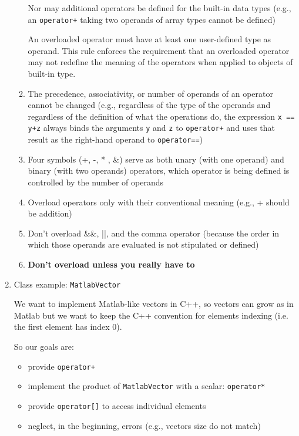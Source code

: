 \begin{enumerate}[$\triangleright$]
\begin{enumerate}[(1)]
    Nor may additional operators be defined for the built-in data types (e.g., an \texttt{operator+} taking two operands of array types cannot be defined)

    \begin{marker}
    An overloaded operator must have at least one user-defined type as operand. This rule enforces the requirement that an overloaded operator may not redefine the meaning of the operators when applied to objects of built-in type.
    \end{marker}

    \item The precedence, associativity, or number of operands of an operator cannot be changed (e.g., regardless of the type of the operands and regardless of the definition of what the operations do, the expression \texttt{x == y+z} always binds the arguments \texttt{y} and \texttt{z} to \texttt{operator+} and uses that result as the right-hand operand to \texttt{operator==})

    \item Four symbols (+, -, * , \&) serve as both unary (with one operand) and binary (with two operands) operators, which operator is being defined is controlled by the number of operands

    \item Overload operators only with their conventional meaning (e.g., + should be addition)

    \item Don't overload \&\&, ||, and the comma operator (because the order in which those operands are evaluated is not stipulated or defined)

    \item \textbf{Don’t overload unless you really have to}
\end{enumerate}

\item Class example: \texttt{MatlabVector}

We want to implement Matlab-like vectors in C++, so vectors can grow as in Matlab 
but we want to keep the C++ convention for elements indexing (i.e. the first element has index 0). 

So our goals are:
\begin{itemize}
    \item provide \texttt{operator+}
    \item implement the product of \texttt{MatlabVector} with a scalar: \texttt{operator*}
    \item provide \texttt{operator[]} to access individual elements
    \item neglect, in the beginning, errors (e.g., vectors size do not match)
\end{itemize}


\end{enumerate}
